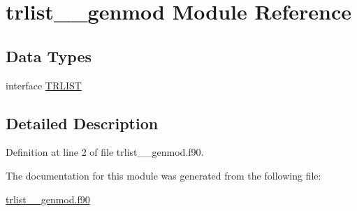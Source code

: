 \hypertarget{classtrlist____genmod}{\section{trlist\+\_\+\+\_\+genmod Module Reference}
\label{classtrlist____genmod}
}
\subsection*{Data Types}
\begin{DoxyCompactItemize}
\item 
interface \hyperlink{interfacetrlist____genmod_1_1TRLIST}{T\+R\+L\+I\+S\+T}
\end{DoxyCompactItemize}


\subsection{Detailed Description}


Definition at line 2 of file trlist\+\_\+\+\_\+genmod.\+f90.



The documentation for this module was generated from the following file\+:\begin{DoxyCompactItemize}
\item 
\hyperlink{trlist____genmod_8f90}{trlist\+\_\+\+\_\+genmod.\+f90}\end{DoxyCompactItemize}
